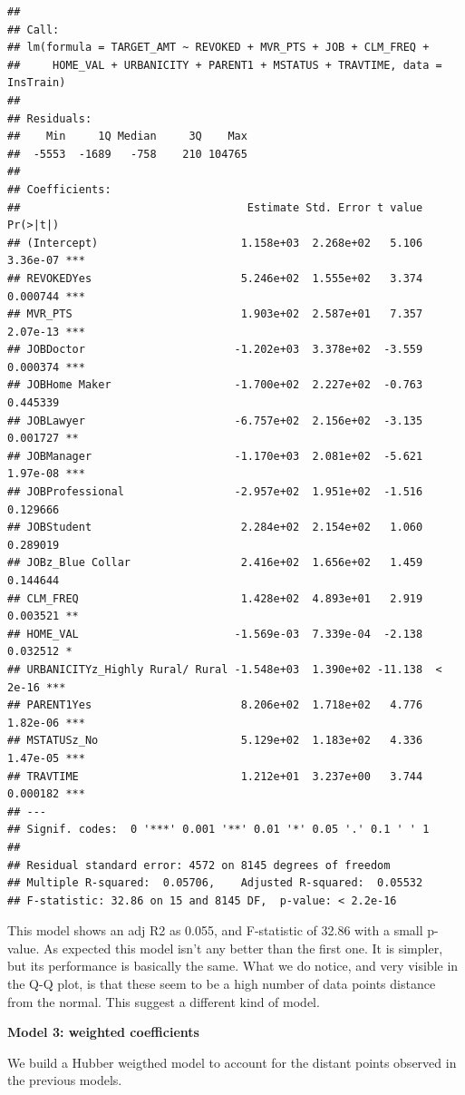 \documentclass[]{article}
\begin{document}
\begin{verbatim}
## 
## Call:
## lm(formula = TARGET_AMT ~ REVOKED + MVR_PTS + JOB + CLM_FREQ + 
##     HOME_VAL + URBANICITY + PARENT1 + MSTATUS + TRAVTIME, data = InsTrain)
## 
## Residuals:
##    Min     1Q Median     3Q    Max 
##  -5553  -1689   -758    210 104765 
## 
## Coefficients:
##                                   Estimate Std. Error t value Pr(>|t|)    
## (Intercept)                      1.158e+03  2.268e+02   5.106 3.36e-07 ***
## REVOKEDYes                       5.246e+02  1.555e+02   3.374 0.000744 ***
## MVR_PTS                          1.903e+02  2.587e+01   7.357 2.07e-13 ***
## JOBDoctor                       -1.202e+03  3.378e+02  -3.559 0.000374 ***
## JOBHome Maker                   -1.700e+02  2.227e+02  -0.763 0.445339    
## JOBLawyer                       -6.757e+02  2.156e+02  -3.135 0.001727 ** 
## JOBManager                      -1.170e+03  2.081e+02  -5.621 1.97e-08 ***
## JOBProfessional                 -2.957e+02  1.951e+02  -1.516 0.129666    
## JOBStudent                       2.284e+02  2.154e+02   1.060 0.289019    
## JOBz_Blue Collar                 2.416e+02  1.656e+02   1.459 0.144644    
## CLM_FREQ                         1.428e+02  4.893e+01   2.919 0.003521 ** 
## HOME_VAL                        -1.569e-03  7.339e-04  -2.138 0.032512 *  
## URBANICITYz_Highly Rural/ Rural -1.548e+03  1.390e+02 -11.138  < 2e-16 ***
## PARENT1Yes                       8.206e+02  1.718e+02   4.776 1.82e-06 ***
## MSTATUSz_No                      5.129e+02  1.183e+02   4.336 1.47e-05 ***
## TRAVTIME                         1.212e+01  3.237e+00   3.744 0.000182 ***
## ---
## Signif. codes:  0 '***' 0.001 '**' 0.01 '*' 0.05 '.' 0.1 ' ' 1
## 
## Residual standard error: 4572 on 8145 degrees of freedom
## Multiple R-squared:  0.05706,    Adjusted R-squared:  0.05532 
## F-statistic: 32.86 on 15 and 8145 DF,  p-value: < 2.2e-16
\end{verbatim}

This model shows an adj R2 as 0.055, and F-statistic of 32.86 with a
small p-value. As expected this model isn't any better than the first
one. It is simpler, but its performance is basically the same. What we
do notice, and very visible in the Q-Q plot, is that these seem to be a
high number of data points distance from the normal. This suggest a
different kind of model.

\textbf{Model 3: weighted coefficients}

We build a Hubber weigthed model to account for the distant points
observed in the previous models.
\end{document}
